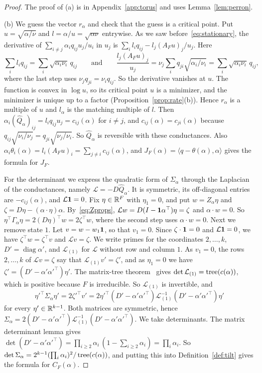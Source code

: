 \begin{proof}
The proof of (a) is in Appendix~\ref{app:torus} and uses Lemma~\ref{lem:perron}.

(b) We guess the vector $r_\alpha$ and check that the guess is a critical point. Put
$u=\sqrt{\alpha/\nu}$ and $l=\alpha/u=\sqrt{\alpha\nu}$ entrywise. As we saw
before~\eqref{eq:stationary}, the derivative of $\sum_{i\ne j}\alpha_iq_{ij}u_j/u_i$ in $u_j$ is
$\sum_il_iq_{ij}-l_j(A_Fu)_j/u_j$. Here
\[
\sum_il_iq_{ij}=\sum_i\sqrt{\alpha_i\nu_i}\,q_{ij}\qquad\text{and}\qquad
\frac{l_j(A_Fu)_j}{u_j}=\nu_j\sum_iq_{ji}\sqrt{\alpha_i/\nu_i}
=\sum_i\sqrt{\alpha_i\nu_i}\,q_{ij},
\]
where the last step uses $\nu_jq_{ji}=\nu_iq_{ij}$. So the derivative vanishes at $u$. The
function is convex in $\log u$, so its critical point $u$ is a minimizer, and the minimizer is
unique up to a factor (Proposition~\ref{prop:rate}(b)). Hence $r_\alpha$ is a multiple of $u$ and
$l_\alpha$ is the matching multiple of $l$. Then
$\alpha_i(\widehat Q_\alpha)_{ij}=l_iq_{ij}u_j=c_{ij}(\alpha)$ for $i\ne j$, and
$c_{ij}(\alpha)=c_{ji}(\alpha)$ because $q_{ij}\sqrt{\nu_i/\nu_j}=q_{ji}\sqrt{\nu_j/\nu_i}$.
So $\widehat Q_\alpha$ is reversible with these conductances. Also
$\alpha_i\theta_i(\alpha)=l_i(A_Fu)_i=\sum_{j\ne i}c_{ij}(\alpha)$, and
$J_F(\alpha)=\langle q-\theta(\alpha),\alpha\rangle$ gives the formula for $J_F$.

For the determinant we express the quadratic form of $\Sigma_\alpha$ through the Laplacian of the
conductances, namely $\mathcal L=-D\widehat Q_\alpha$. It is symmetric, its off-diagonal entries
are $-c_{ij}(\alpha)$, and $\mathcal L\mathbf{1}=0$. Fix $\eta\in\mathbb{R}^F$ with $\eta_1=0$, and put
$w=Z_\alpha\eta$ and $\zeta=D\eta-(\alpha\cdot\eta)\alpha$. By~\eqref{eq:Zprops},
$\mathcal Lw=D(I-\mathbf{1}\alpha^\top)\eta=\zeta$ and $\alpha\cdot w=0$. So
$\eta^\top\Gamma_\alpha\eta=2(D\eta)^\top w=2\zeta^\top w$, where the second step uses
$\alpha\cdot w=0$. Next we remove state $1$. Let $v=w-w_1\mathbf{1}$,
so that $v_1=0$. Since $\zeta\cdot\mathbf{1}=0$ and $\mathcal L\mathbf{1}=0$, we have
$\zeta^\top w=\zeta^\top v$ and $\mathcal Lv=\zeta$. We write primes for the coordinates
$2,\dots,k$, $D'=\operatorname{diag}\alpha'$, and $\mathcal L_{(1)}$ for $\mathcal L$ without row
and column $1$. As $v_1=0$, the rows $2,\dots,k$ of $\mathcal Lv=\zeta$ say that
$\mathcal L_{(1)}v'=\zeta'$, and as $\eta_1=0$ we have $\zeta'=(D'-\alpha'\alpha'^\top)\eta'$. The
matrix-tree theorem~\cite{bollobas1998} gives $\det\mathcal L_{(1)}=\operatorname{tree}(c(\alpha))$, which is
positive because $F$ is irreducible. So $\mathcal L_{(1)}$ is invertible, and
\[
\eta'^\top\Sigma_\alpha\eta'=2\zeta'^\top v'
=2\eta'^\top(D'-\alpha'\alpha'^\top)\mathcal L_{(1)}^{-1}(D'-\alpha'\alpha'^\top)\eta'
\]
for every $\eta'\in\mathbb{R}^{k-1}$. Both matrices are symmetric, hence
$\Sigma_\alpha=2(D'-\alpha'\alpha'^\top)\mathcal L_{(1)}^{-1}(D'-\alpha'\alpha'^\top)$. We take
determinants. The matrix determinant lemma gives
$\det(D'-\alpha'\alpha'^\top)=\prod_{i\ge2}\alpha_i\,(1-\sum_{i\ge2}\alpha_i)=\prod_i\alpha_i$.
So $\det\Sigma_\alpha=2^{k-1}(\prod_i\alpha_i)^2/\operatorname{tree}(c(\alpha))$, and putting this into
Definition~\ref{def:tilt} gives the formula for $C_F(\alpha)$.
\end{proof}

